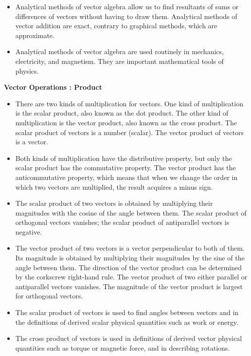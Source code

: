 \documentclass[12pt,addpoints]{exam}
\begin{document}
\begin{questions}
\begin{itemize}
			\item Analytical methods of vector algebra allow us to find resultants of sums or differences of vectors without having to draw them. Analytical methods of vector addition are exact, contrary to graphical methods, which are approximate.
			\item Analytical methods of vector algebra are used routinely in mechanics, electricity, and magnetism. They are important mathematical tools of physics.
		\end{itemize}
		\begin{center}
			\textbf{Vector Operations : Product} 
		\end{center}
		\begin{itemize}
			\item There are two kinds of multiplication for vectors. One kind of multiplication is the scalar product, also known as the dot product. The other kind of multiplication is the vector product, also known as the cross product. The scalar product of vectors is a number (scalar). The vector product of vectors is a vector.
			\item Both kinds of multiplication have the distributive property, but only the scalar product has the commutative property. The vector product has the anticommutative property, which means that when we change the order in which two vectors are multiplied, the result acquires a minus sign.
			\item The scalar product of two vectors is obtained by multiplying their magnitudes with the cosine of the angle between them. The scalar product of orthogonal vectors vanishes; the scalar product of antiparallel vectors is negative.
			\item The vector product of two vectors is a vector perpendicular to both of them. Its magnitude is obtained by multiplying their magnitudes by the sine of the angle between them. The direction of the vector product can be determined by the corkscrew right-hand rule. The vector product of two either parallel or antiparallel vectors vanishes. The magnitude of the vector product is largest for orthogonal vectors.
			\item The scalar product of vectors is used to find angles between vectors and in the definitions of derived scalar physical quantities such as work or energy.
			\item The cross product of vectors is used in definitions of derived vector physical quantities such as torque or magnetic force, and in describing rotations.
		\end{itemize}

\end{questions}
\end{document}
